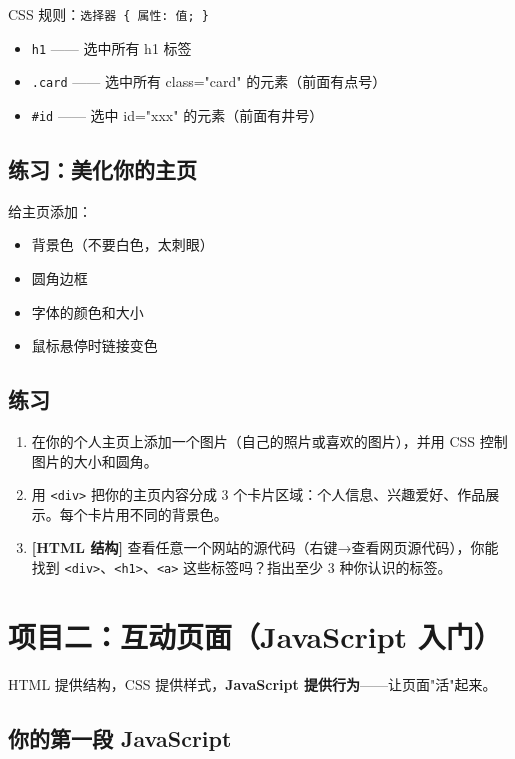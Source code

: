 \documentclass[a4paper,12pt]{ctexart}
\begin{document}
CSS 规则：\texttt{选择器 \{ 属性: 值; \}}

\begin{itemize}
  \item \texttt{h1} —— 选中所有 h1 标签
  \item \texttt{.card} —— 选中所有 class="card" 的元素（前面有点号）
  \item \texttt{\#id} —— 选中 id="xxx" 的元素（前面有井号）
\end{itemize}

\subsection*{练习：美化你的主页}

给主页添加：
\begin{itemize}
  \item 背景色（不要白色，太刺眼）
  \item 圆角边框
  \item 字体的颜色和大小
  \item 鼠标悬停时链接变色
\end{itemize}

\subsection*{练习}

\begin{enumerate}
  \item 在你的个人主页上添加一个图片（自己的照片或喜欢的图片），并用 CSS 控制图片的大小和圆角。
  \item 用 \texttt{<div>} 把你的主页内容分成 3 个卡片区域：个人信息、兴趣爱好、作品展示。每个卡片用不同的背景色。
  \item \textbf{[HTML 结构]} 查看任意一个网站的源代码（右键→查看网页源代码），你能找到 \texttt{<div>}、\texttt{<h1>}、\texttt{<a>} 这些标签吗？指出至少 3 种你认识的标签。
\end{enumerate}

\section*{项目二：互动页面（JavaScript 入门）}

HTML 提供结构，CSS 提供样式，\textbf{JavaScript 提供行为}——让页面"活"起来。

\subsection*{你的第一段 JavaScript}
\end{document}
